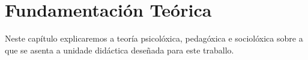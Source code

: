 \chapter{Fundamentación Teórica}\label{chap:fundamentacion}
Neste capítulo explicaremos a teoría psicolóxica, pedagóxica e sociolóxica sobre a que se asenta a unidade didáctica deseñada para este traballo.




